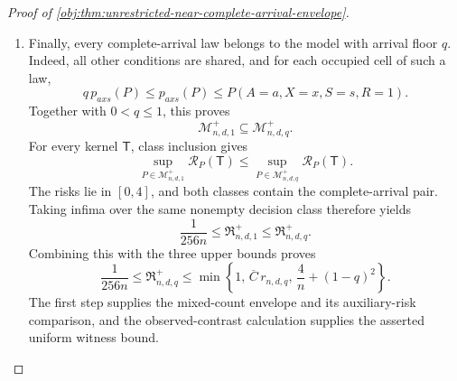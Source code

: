 \begin{proof}[Proof of \cref{obj:thm:unrestricted-near-complete-arrival-envelope}]
\begin{enumerate}
\[\begin{aligned}
\max_{\iota\in\{0,1\}}
Q_{\mathrm{test},\iota}^{(n)}(\mathcal E_{\mathrm{test},\iota})\\
&=
\max_{\iota\in\{0,1\}}
\left\{
\left(\frac{\delta_{\mathrm{gap}}}{2}\right)^2
Q_{\mathrm{test},\iota}^{(n)}(\mathcal E_{\mathrm{test},\iota})
\right\}\\
&\le
\max_{\iota\in\{0,1\}}
E_{P_{\mathrm{test},\iota}}\!\left[
\left(b_{\mathsf T}(\mathbf O_n)-\tau(P_{\mathrm{test},\iota})\right)^2
\right]\\
&\le
\max_{\iota\in\{0,1\}}
\mathcal R_{P_{\mathrm{test},\iota}}(\mathsf T).
\end{aligned}
\]
For every bounded kernel and every full-data law, bounded actions and
\(\tau(P)\in[-1,1]\) also give
\[
0\le\mathcal R_P(\mathsf T)\le4.
\]
Thus the worst-case risks are finite. The decision class is nonempty because it contains the zero estimator, and the complete-arrival class contains the constructed pair. Taking the supremum over that class and then the infimum over kernels gives
\[
\mathfrak R^{+}_{n,d,1}
\ge
\frac{\delta_{\mathrm{gap}}^2}{16}
=
\frac1{256n}.
\]

\item Finally, every complete-arrival law belongs to the model with arrival floor \(q\). Indeed, all other conditions are shared, and for each occupied cell of such a law,
\[
q\,p_{axs}(P)
\le p_{axs}(P)
\le P(A=a,X=x,S=s,R=1).
\]
Together with \(0<q\le1\), this proves
\[
\mathcal M^{+}_{n,d,1}\subseteq\mathcal M^{+}_{n,d,q}.
\]
For every kernel \(\mathsf T\), class inclusion gives
\[
\sup_{P\in\mathcal M^{+}_{n,d,1}}\mathcal R_P(\mathsf T)
\le
\sup_{P\in\mathcal M^{+}_{n,d,q}}\mathcal R_P(\mathsf T).
\]
The risks lie in \([0,4]\), and both classes contain the complete-arrival pair. Taking infima over the same nonempty decision class therefore yields
\[
\frac1{256n}
\le
\mathfrak R^{+}_{n,d,1}
\le
\mathfrak R^{+}_{n,d,q}.
\]
Combining this with the three upper bounds proves
\[
\frac1{256n}
\le
\mathfrak R^{+}_{n,d,q}
\le
\min\left\{
1,\,
\overline C\,r_{n,d,q},\,
\frac4n+(1-q)^2
\right\}.
\]
The first step supplies the mixed-count envelope and its auxiliary-risk comparison, and the observed-contrast calculation supplies the asserted uniform witness bound.
\end{enumerate}
\end{proof}


